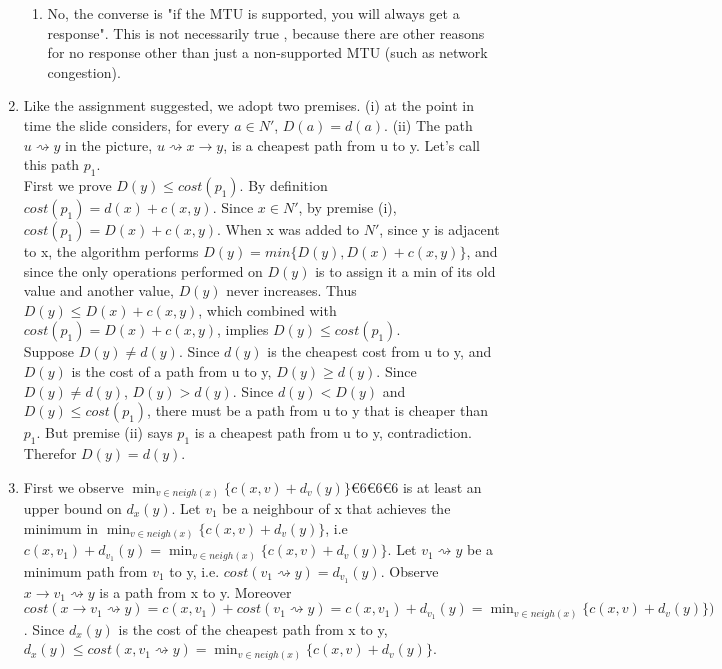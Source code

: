 \documentclass[12pt]{article}
\begin{document}
\begin{enumerate}
\begin{enumerate}
		\item No, the converse is "if the MTU is supported, you will always get a response". This is not necessarily true , because there are other reasons for no response other than just a non-supported MTU (such as network congestion).
	\end{enumerate}
	\item %
        Like the assignment suggested, we adopt two premises. 
        (i) at the point in time the slide considers, for every $a \in N'$, $D(a) = d(a)$. 
        (ii) The path $u \rightsquigarrow y$ in the picture, $u \rightsquigarrow x \rightarrow y$,
        is a cheapest path from u to y. Let's call this path $p_1$.\\


        First we prove $D(y) \leq cost(p_1)$. By definition $cost(p_1) = d(x) + c(x,y)$. Since $x \in N'$, 
        by premise (i), $cost(p_1) = D(x) + c(x,y)$. When x was added to $N'$, since y is adjacent to x,
        the algorithm performs $D(y) = min\{D(y), D(x)+c(x,y)\}$, and since the only operations performed on $D(y)$ is to assign
        it a min of its old value and another value, $D(y)$ never increases. Thus $D(y) \leq D(x) + c(x,y)$,
        which combined with $cost(p_1) = D(x) + c(x,y)$, implies $D(y) \leq cost(p_1)$. \\

        Suppose $D(y) \neq d(y)$. Since $d(y)$ is the cheapest cost from u to y, and $D(y)$ is the 
        cost of a path from u to y, $D(y) \geq d(y)$. Since $D(y) \neq d(y)$, $D(y) > d(y)$. 
        Since $d(y) < D(y)$ and $D(y) \leq cost(p_1)$, there must be a path from u to y that is cheaper 
        than $p_1$. But premise (ii) says $p_1$ is a cheapest path from u to y, contradiction. Therefor $D(y) = d(y)$.
        

	\item %
        
        First we observe $\min_{v \in neigh(x)}\{c(x,v) + d_v(y)\}666$
        is at least an upper bound on $d_x(y)$. Let $v_1$ be a neighbour of x that achieves the minimum in
        $\min_{v \in neigh(x)}\{c(x,v) + d_v(y)\}$, i.e $c(x,v_1)+d_{v_1}(y) = \min_{v \in neigh(x)}\{c(x,v) + d_v(y)\}$.  
        Let $v_1 \rightsquigarrow y$ be a minimum path from $v_1$
        to y, i.e. $cost(v_1 \rightsquigarrow y) = d_{v_1}(y)$. Observe $x \rightarrow v_1 \rightsquigarrow y$ is a path from x to y. Moreover
        $cost(x \rightarrow v_1 \rightsquigarrow y) = c(x, v_1) + cost(v_1 \rightsquigarrow y) = c(x, v_1) + d_{v_1}(y) =
        \min_{v \in neigh(x)}\{c(x,v) + d_v(y)\})$.
        Since $d_x(y)$ is the cost of the cheapest path from x to y, 
        $d_x(y) \leq cost(x,v_1 \rightsquigarrow y) = \min_{v \in neigh(x)}\{c(x,v) + d_v(y)\}$. \\


\end{enumerate}
\end{document}
